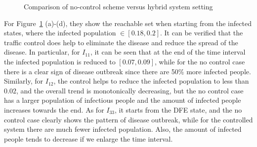 \documentclass[review]{elsarticle}
\theoremstyle{plain}
\theoremstyle{definition}
\theoremstyle{remark}
\numberwithin{equation}{section}
\theoremstyle{remark}
\begin{document}
\begin{figure}[H]
	\caption{Comparison of no-control scheme versus hybrid system setting}
	\label{fig:compare}
\end{figure}

For Figure~\ref{fig:compare} (a)-(d), they show the reachable set when starting from the infected states, where the infected population $\in[0.18,0.2]$. It can be verified that the traffic control does help to eliminate the disease and reduce the spread of the disease. In particular, for $I_{11}$, it can be seen that at the end of the time interval the infected population is reduced to $[0.07,0.09]$, while for the no control case there is a clear sign of disease outbreak since there are 50\% more infected people. Similarly, for $I_{12}$, the control helps to reduce the infected population to less than $0.02$, and the overall trend is monotonically decreasing, but the no control case has a larger population of infectious people and the amount of infected people increases towards the end. As for $I_{33}$, it starts from the DFE state, and the no control case clearly shows the pattern of disease outbreak, while for the controlled system there are much fewer infected population. Also, the amount of infected people tends to decrease if we enlarge the time interval. 

 


\end{document}
